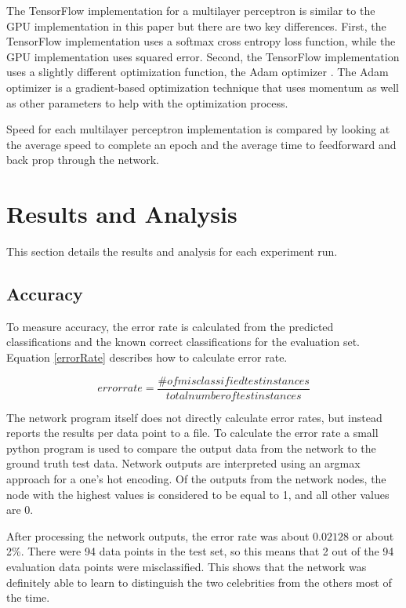 \documentclass[jair, twoside,11pt,theapa]{article}
\begin{document}
The TensorFlow implementation for a multilayer perceptron is similar to the GPU implementation in this paper but there are two key differences. 
First, the TensorFlow implementation uses a softmax cross entropy loss function, while the GPU implementation uses squared error. 
Second, the TensorFlow implementation uses a slightly different optimization function, the Adam optimizer \cite{AdamOptimizer}. 
The Adam optimizer is a gradient-based optimization technique that uses momentum as well as other parameters to help with the optimization process.  

Speed for each multilayer perceptron implementation is compared by looking at the average speed to complete an epoch and the average time to feedforward and back prop through the network. 

\section{Results and Analysis}
\label{Results}
This section details the results and analysis for each experiment run. 

\subsection{Accuracy}
\label{Accuracy}
To measure accuracy, the error rate is calculated from the predicted classifications and the known correct classifications for the evaluation set. 
Equation \ref{errorRate} describes how to calculate error rate. 

\begin{equation}
\label{errorRate}
error rate = \frac{\# of misclassified test instances}{total number of test instances}
\end{equation}

The network program itself does not directly calculate error rates, but instead reports the results per data point to a file. 
To calculate the error rate a small python program is used to compare the output data from the network to the ground truth test data. 
Network outputs are interpreted using an argmax approach for a one's hot encoding. 
Of the outputs from the network nodes, the node with the highest values is considered to be equal to 1, and all other values are 0. 

After processing the network outputs, the error rate was about $0.02128$ or about 2\%.
There were 94 data points in the test set, so this means that 2 out of the 94 evaluation data points were misclassified. 
This shows that the network was definitely able to learn to distinguish the two celebrities from the others most of the time. 
\end{document}
